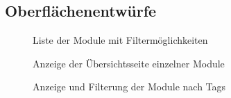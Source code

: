 \subsection{Oberflächenentwürfe}
\label{app:Entwuerfe}
\begin{figure}[htb]
\centering
{}
\caption{Liste der Module mit Filtermöglichkeiten}
\end{figure}

\begin{figure}[htb]
\centering
{}
\caption{Anzeige der Übersichtsseite einzelner Module}
\end{figure}

\begin{figure}[htb]
\centering
{}
\caption{Anzeige und Filterung der Module nach Tags}
\end{figure}
